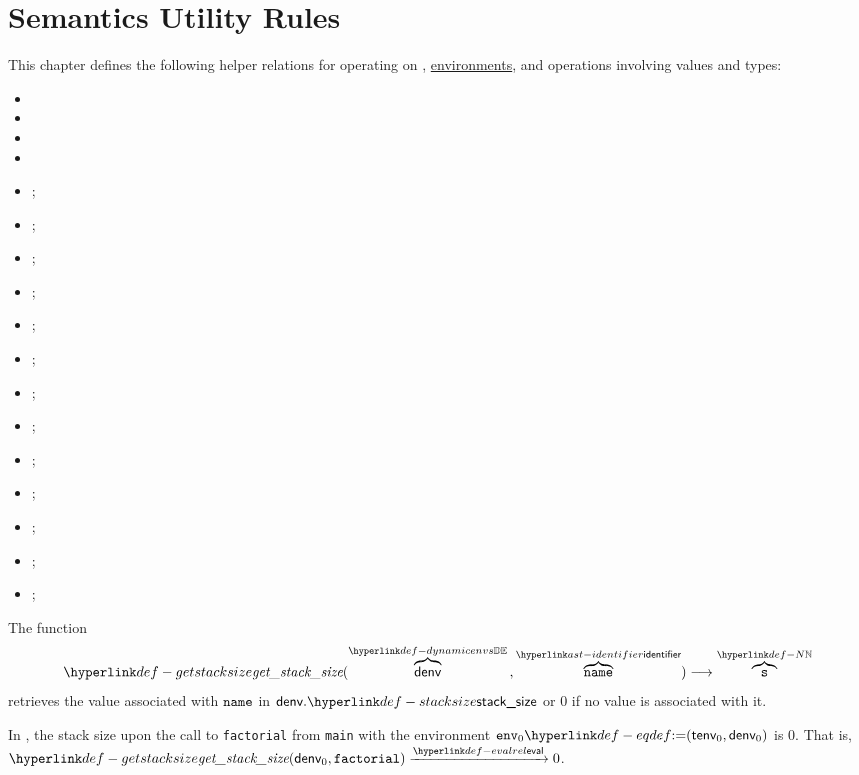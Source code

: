 \chapter{Semantics Utility Rules\label{chap:SemanticsUtilityRules}}

This chapter defines the following helper relations for operating on \nativevalues,
\hyperlink{def-envs}{environments}, and operations involving values and types:
\begin{itemize}
  \item {}
  \item {}
  \item {}
  \item {}
  \item {};
  \item {};
  \item {};
  \item {};
  \item {};
  \item {};
  \item {};
  \item {};
  \item {};
  \item {};
  \item {};
  \item {};
  \item {};
\end{itemize}

\hypertarget{def-getstacksize}{}
The function
\[
\getstacksize(\overname{\denv}{\dynamicenvs} \aslsep \overname{\name}{\identifier}) \aslto \overname{\vs}{\N}
\]
retrieves the value associated with $\texttt{name}$ in $\denv.\stacksize$ or $0$ if no value is associated with it.

In , the stack size upon the call to \verb|factorial| from \verb|main|
with the environment $\env_0 \eqdef (\tenv_0, \denv_0)$ is $0$.
That is, $\getstacksize(\denv_0, \factorial) \evalarrow 0$.

